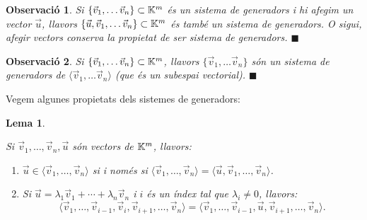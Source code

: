 \documentclass[
  11pt,
]{book}
\numberwithin{dummy}{section}
\theoremstyle{maincolornumbox}
\newtheorem{remarkT}{Observació}[chapter]
\theoremstyle{blacknumex}
\theoremstyle{blacknumbox}
\theoremstyle{maincolornum}
\newtheorem{lemmaT}{Lema}[chapter]
\newenvironment{lemma}{\begin{pBox}\begin{lemmaT}}{\end{lemmaT}\end{pBox}}
\newenvironment{remark}{\begin{remarkT}}{\hfill{\tiny\ensuremath{\blacksquare}}\end{remarkT}}
\newlength\esp
\begin{document}
\begin{remark}
Si
\(\{\vec v_1, \dots \vec v_n\}\subset \mathbb{K}^m\) és un sistema de generadors i
hi afegim un vector \(\vec u\), llavors
\(\{\vec u,\vec v_1, \dots \vec v_n\}\subset \mathbb{K}^m\) és també un sistema de
generadors. O sigui, afegir vectors conserva la propietat de ser
\emph{sistema de generadors}.
\end{remark}

\begin{remark}
Si \(\{\vec v_1, \dots \vec v_n\}\subset \mathbb{K}^m\), llavors
\(\{\vec v_1, \dots \vec v_n\}\) són un sistema de generadors de
\(\langle \vec v_1, \dots \vec v_n\rangle\) (que és un subespai
vectorial).
\end{remark}

Vegem algunes propietats dels sistemes de generadors:

\begin{lemma}
\protect\hypertarget{lem:generadors}{}\label{lem:generadors}

Si
\(\vec v_1, \dots , \vec v_n, \vec u\) són vectors de \(\mathbb{K}^m\), llavors:

\begin{enumerate}
\def\labelenumi{\arabic{enumi}.}
\item
  \(\vec u\in \langle \vec v_1, \dots , \vec v_n \rangle\) si i només si
  \(\langle \vec v_1, \dots , \vec v_n \rangle=\langle\vec u, \vec v_1, \dots , \vec v_n \rangle\).
\item
  Si \(\vec u = \lambda_1 \vec v_1 + \cdots + \lambda_n \vec v_n\) i \(i\)
  és un índex tal que \(\lambda_i\neq 0\), llavors:
  \[\langle \vec v_1,\dots,\vec v_{i-1},\vec v_i , \vec v_{i+1}, \dots , \vec v_n\rangle=\langle \vec v_1, \dots,\vec v_{i-1},\vec u , \vec v_{i+1},\dots,\vec v_n\rangle.\]
\end{enumerate}

\end{lemma}
\end{document}
